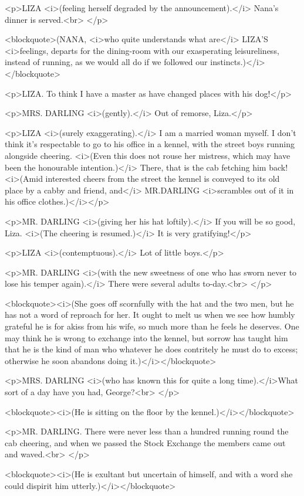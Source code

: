 <p>LIZA <i>(feeling herself degraded by the announcement).</i> Nana's
dinner is served.<br>
</p>

<blockquote>(NANA, <i>who quite understands what are</i> LIZA'S
<i>feelings, departs for the dining-room with our exasperating
leisureliness, instead of running, as we would all do if we followed
our instincts.)</i></blockquote>

<p>LIZA. To think I have a master as have changed places with his
dog!</p>

<p>MRS. DARLING <i>(gently).</i> Out of remorse, Liza.</p>

<p>LIZA <i>(surely exaggerating).</i> I am a married woman myself. I
don't think it's respectable to go to his office in a kennel, with
the street boys running alongside cheering. <i>(Even this does not
rouse her mistress, which may have been the honourable
intention.)</i> There, that is the cab fetching him back! <i>(Amid
interested cheers from the street the kennel is conveyed to its old
place by a cabby and friend, and</i> MR.DARLING <i>scrambles out of
it in his office clothes.)</i></p>

<p>MR. DARLING <i>(giving her his hat loftily).</i> If you will be so
good, Liza. <i>(The cheering is resumed.)</i> It is very
gratifying!</p>

<p>LIZA <i>(contemptuous).</i> Lot of little boys.</p>

<p>MR. DARLING <i>(with the new sweetness of one who has sworn never
to lose his temper again).</i> There were several adults to-day.<br>
</p>

<blockquote><i>(She goes off scornfully with the hat and the two men,
but he has not a word of reproach for her. It ought to melt us when
we see how humbly grateful he is for akiss from his wife, so much
more than he feels he deserves. One may think he is wrong to exchange
into the kennel, but sorrow has taught him that he is the kind of man
who whatever he does contritely he must do to excess; otherwise he
soon abandons doing it.)</i></blockquote>

<p>MRS. DARLING <i>(who has known this for quite a long
time).</i>What sort of a day have you had, George?<br>
</p>

<blockquote><i>(He is sitting on the floor by the
kennel.)</i></blockquote>

<p>MR. DARLING. There were never less than a hundred running round
the cab cheering, and when we passed the Stock Exchange the members
came out and waved.<br>
</p>

<blockquote><i>(He is exultant but uncertain of himself, and with a
word she could dispirit him utterly.)</i></blockquote>

